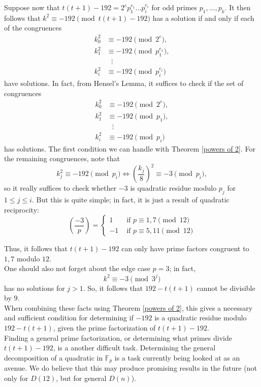 \documentclass[12pt]{amsart}
\theoremstyle{theorem}
\theoremstyle{definition}
\theoremstyle{plain}
\begin{document}
Suppose now that $t(t+1) - 192 = 2^{e} p_1^{e_1} \dots p_i^{e_i}$ for odd primes $p_1, \dots, p_k$. It then follows that $k^2 \equiv -192 \pmod{t(t+1) - 192}$ has a solution if and only if each of the congruences 
\begin{align*}
k_{0}^2 &\equiv -192 \pmod{2^e}, \\
k_{1}^2 &\equiv -192 \pmod{p_1^{e_1}}, \\
&\text{   } \vdots \\
k_{i}^2 &\equiv -192 \pmod{p_i^{e_i}}
\end{align*}
have solutions. In fact, from Hensel's Lemma, it suffices to check if the set of congruences 
\begin{align*}
k_{0}^2 &\equiv -192 \pmod{2^e}, \\
k_{1}^2 &\equiv -192 \pmod{p_1}, \\
&\text{   } \vdots \\
k_{i}^2 &\equiv -192 \pmod{p_i}
\end{align*}
has solutions. The first condition we can handle with Theorem \ref{powers of 2}. For the remaining congruences, note that $$k_j^2 \equiv -192 \pmod{p_i} \iff \left(\frac{k_j}{8} \right)^2 \equiv -3 \pmod{p_i},$$ so it really suffices to check whether $-3$ is quadratic residue modulo $p_j$ for $1 \le j \le i$. But this is quite simple; in fact, it is just a result of quadratic reciprocity: $$\left(\frac{-3}{p} \right) = \begin{cases} 
      1 & \text{ if } p \equiv 1, 7 \pmod{12} \\
      -1 & \text{ if } p \equiv 5, 11 \pmod{12}
   \end{cases}
$$

Thus, it follows that $t(t+1) - 192$ can only have prime factors congruent to $1, 7$ modulo $12$. 
\\

One should also not forget about the edge case $p = 3$; in fact, $$k^2 \equiv -3 \pmod{3^j}$$ has no solutions for $j > 1$. So, it follows that $192 - t(t+1)$ cannot be divisible by $9$.
\\

When combining these facts using Theorem \ref{powers of 2}, this gives a necessary and sufficient condition for determining if $-192$ is a quadratic residue modulo $192 - t(t+1)$, given the prime factorization of $t(t+1) - 192$.
\\

Finding a general prime factorization, or determining what primes divide $t(t+1) - 192$, is a another difficult task. Determining the general decomposition of a quadratic in $\mathbb{F}_p$ is a task currently being looked at as an avenue. We do believe that this may produce promising results in the future (not only for $D(12)$, but for general $D(n)$). 
\end{document}
